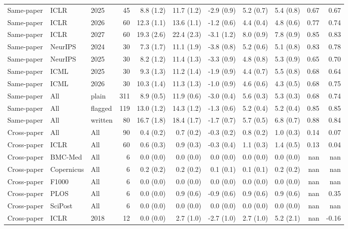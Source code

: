 \begin{tabular}{lllrrrrrrrr}
Same-paper & ICLR & 2025 & 45 & 8.8 (1.2) & 11.7 (1.2) & -2.9 (0.9) & 5.2 (0.7) & 5.4 (0.8) & 0.67 & 0.67 \\
Same-paper & ICLR & 2026 & 60 & 12.3 (1.1) & 13.6 (1.1) & -1.2 (0.6) & 4.4 (0.4) & 4.8 (0.6) & 0.77 & 0.74 \\
Same-paper & ICLR & 2027 & 60 & 19.3 (2.6) & 22.4 (2.3) & -3.1 (1.2) & 8.0 (0.9) & 7.8 (0.9) & 0.85 & 0.83 \\
Same-paper & NeurIPS & 2024 & 30 & 7.3 (1.7) & 11.1 (1.9) & -3.8 (0.8) & 5.2 (0.6) & 5.1 (0.8) & 0.83 & 0.78 \\
Same-paper & NeurIPS & 2025 & 30 & 8.2 (1.2) & 11.4 (1.3) & -3.3 (0.9) & 4.8 (0.8) & 5.3 (0.9) & 0.65 & 0.70 \\
Same-paper & ICML & 2025 & 30 & 9.3 (1.3) & 11.2 (1.4) & -1.9 (0.9) & 4.4 (0.7) & 5.5 (0.8) & 0.68 & 0.64 \\
Same-paper & ICML & 2026 & 30 & 10.3 (1.4) & 11.3 (1.3) & -1.0 (0.9) & 4.6 (0.6) & 4.3 (0.5) & 0.68 & 0.75 \\
Same-paper & All & plain & 311 & 8.9 (0.5) & 11.9 (0.6) & -3.0 (0.4) & 5.6 (0.3) & 5.3 (0.3) & 0.68 & 0.74 \\
Same-paper & All & flagged & 119 & 13.0 (1.2) & 14.3 (1.2) & -1.3 (0.6) & 5.2 (0.4) & 5.2 (0.4) & 0.85 & 0.85 \\
Same-paper & All & written & 80 & 16.7 (1.8) & 18.4 (1.7) & -1.7 (0.7) & 5.7 (0.5) & 6.8 (0.7) & 0.88 & 0.84 \\
Cross-paper & All & All & 90 & 0.4 (0.2) & 0.7 (0.2) & -0.3 (0.2) & 0.8 (0.2) & 1.0 (0.3) & 0.14 & 0.07 \\
Cross-paper & ICLR & All & 60 & 0.6 (0.3) & 0.9 (0.3) & -0.3 (0.4) & 1.1 (0.3) & 1.4 (0.5) & 0.13 & 0.04 \\
Cross-paper & BMC-Med & All & 6 & 0.0 (0.0) & 0.0 (0.0) & 0.0 (0.0) & 0.0 (0.0) & 0.0 (0.0) & nan & nan \\
Cross-paper & Copernicus & All & 6 & 0.2 (0.2) & 0.2 (0.2) & 0.1 (0.1) & 0.1 (0.1) & 0.2 (0.2) & nan & nan \\
Cross-paper & F1000 & All & 6 & 0.0 (0.0) & 0.0 (0.0) & 0.0 (0.0) & 0.0 (0.0) & 0.0 (0.0) & nan & nan \\
Cross-paper & PLOS & All & 6 & 0.0 (0.0) & 0.9 (0.6) & -0.9 (0.6) & 0.9 (0.6) & 0.9 (0.6) & nan & 0.35 \\
Cross-paper & SciPost & All & 6 & 0.0 (0.0) & 0.0 (0.0) & 0.0 (0.0) & 0.0 (0.0) & 0.0 (0.0) & nan & nan \\
Cross-paper & ICLR & 2018 & 12 & 0.0 (0.0) & 2.7 (1.0) & -2.7 (1.0) & 2.7 (1.0) & 5.2 (2.1) & nan & -0.16 \\

\end{tabular}
